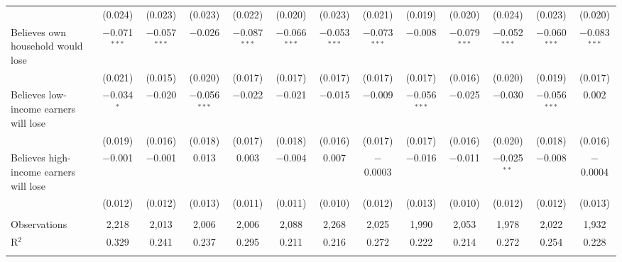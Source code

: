 \begin{tabular}{@{\extracolsep{5pt}}lcccccccccccc}
  & (0.024) & (0.023) & (0.023) & (0.022) & (0.020) & (0.023) & (0.021) & (0.019) & (0.020) & (0.024) & (0.023) & (0.020) \\ 
  Believes own household would lose & $-$0.071$^{***}$ & $-$0.057$^{***}$ & $-$0.026 & $-$0.087$^{***}$ & $-$0.066$^{***}$ & $-$0.053$^{***}$ & $-$0.073$^{***}$ & $-$0.008 & $-$0.079$^{***}$ & $-$0.052$^{***}$ & $-$0.060$^{***}$ & $-$0.083$^{***}$ \\ 
  & (0.021) & (0.015) & (0.020) & (0.017) & (0.017) & (0.017) & (0.017) & (0.017) & (0.016) & (0.020) & (0.019) & (0.017) \\ 
  Believes low-income earners will lose & $-$0.034$^{*}$ & $-$0.020 & $-$0.056$^{***}$ & $-$0.022 & $-$0.021 & $-$0.015 & $-$0.009 & $-$0.056$^{***}$ & $-$0.025 & $-$0.030 & $-$0.056$^{***}$ & 0.002 \\ 
  & (0.019) & (0.016) & (0.018) & (0.017) & (0.018) & (0.016) & (0.017) & (0.017) & (0.016) & (0.020) & (0.018) & (0.016) \\ 
  Believes high-income earners will lose & $-$0.001 & $-$0.001 & 0.013 & 0.003 & $-$0.004 & 0.007 & $-$0.0003 & $-$0.016 & $-$0.011 & $-$0.025$^{**}$ & $-$0.008 & $-$0.0004 \\ 
  & (0.012) & (0.012) & (0.013) & (0.011) & (0.011) & (0.010) & (0.012) & (0.013) & (0.010) & (0.012) & (0.012) & (0.013) \\ 
 \hline \\[-1.8ex] 

Observations & 2,218 & 2,013 & 2,006 & 2,006 & 2,088 & 2,268 & 2,025 & 1,990 & 2,053 & 1,978 & 2,022 & 1,932 \\ 
R$^{2}$ & 0.329 & 0.241 & 0.237 & 0.295 & 0.211 & 0.216 & 0.272 & 0.222 & 0.214 & 0.272 & 0.254 & 0.228 \\ 
\hline 
\hline \\[-1.8ex] 
\end{tabular} 
